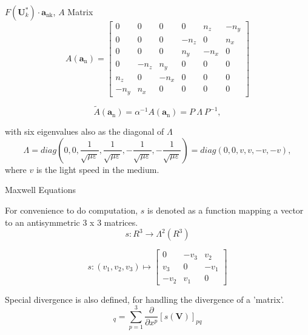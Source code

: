 \begin{frame}{$F\left(\boldsymbol{U}_{k}^{*}\right) \cdot \boldsymbol{a}_{\mathrm{nk}}$, $A$ Matrix}
\begin{equation}
A\left(\boldsymbol{a}_{\mathrm{n}}\right)=\left[\begin{array}{cccccc}{0} & {0} & {0} & {0} & {n_{z}} & {-n_{y}} \\ {0} & {0} & {0} & {-n_{z}} & {0} & {n_{x}} \\ {0} & {0} & {0} & {n_{y}} & {-n_{x}} & {0} \\ {0} & {-n_{z}} & {n_{y}} & {0} & {0} & {0} \\ {n_{z}} & {0} & {-n_{x}} & {0} & {0} & {0} \\ {-n_{y}} & {n_{x}} & {0} & {0} & {0} & {0}\end{array}\right]
\end{equation}

\begin{equation}
\tilde{A}\left(\boldsymbol{a}_{\mathrm{n}}\right)=\alpha^{-1} A\left(\boldsymbol{a}_{\mathrm{n}}\right)=P\ \Lambda\ P^{-1},
\end{equation}

with six eigenvalues also as the diagonal of $\Lambda$
\begin{equation}
\Lambda = diag \left(0,0, \frac{1}{\sqrt{\mu \varepsilon}}, \frac{1}{\sqrt{\mu \varepsilon}},-\frac{1}{\sqrt{\mu \varepsilon}},-\frac{1}{\sqrt{\mu \varepsilon}}\right) = diag \left(0,0,v,v,-v,-v\right),
\end{equation}
where $v$ is the light speed in the medium. 
\end{frame}

\begin{frame}{Maxwell Equations}

For convenience to do computation, $s$ is denoted as a function mapping a vector to an antisymmetric 3 x 3 matrices.
\begin{equation}
s : R^{3} \rightarrow \Lambda^{2}\left(R^{3}\right)
\end{equation}


\begin{equation}
s :\left(v_{1}, v_{2}, v_{3}\right) \longmapsto\left[\begin{array}{ccc}{0} & {-v_{3}} & {v_{2}} \\ {v_{3}} & {0} & {-v_{1}} \\ {-v_{2}} & {v_{1}} & {0}\end{array}\right]
\end{equation}

Special divergence is also defined, for handling the divergence of a 'matrix'.
\begin{equation}
[\operatorname{Div}(s(\boldsymbol{V}))]_{q}=\sum_{p=1}^{3} \frac{\partial}{\partial x^{p}}[s(\boldsymbol{V})]_{p q}
\end{equation}


\end{frame}

